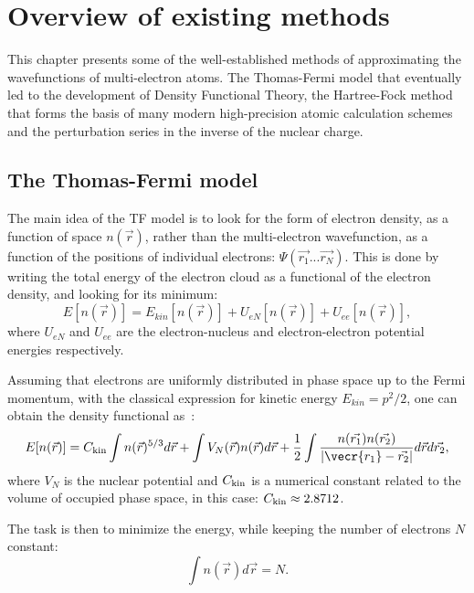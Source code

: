 \chapter{Overview of existing methods}
\label{ch:Methods}

This chapter presents some of the well-established methods of approximating the wavefunctions of multi-electron atoms. The Thomas-Fermi model that eventually led to the development of Density Functional Theory, the Hartree-Fock method that forms the basis of many modern high-precision atomic calculation schemes and the perturbation series in the inverse of the nuclear charge.

\section{The Thomas-Fermi model}
\label{sec:TF}

The main idea of the TF model is to look for the form of electron density, as a function of space $n(\vec{r})$, rather than the multi-electron wavefunction, as a function of the positions of individual electrons: $\Psi(\vec{r_1} ... \vec{r_N})$. This is done by writing the total energy of the electron cloud as a functional of the electron density, and looking for its minimum: 
\begin{equation}
     E[n(\vec{r})] = E_{kin}[n(\vec{r})] + U_{eN}[n(\vec{r})] + U_{ee}[n(\vec{r})],
\end{equation}
where $U_{eN}$ and $U_{ee}$ are the electron-nucleus and electron-electron potential energies respectively.

Assuming that electrons are uniformly distributed in phase space up to the Fermi momentum, with the classical expression for kinetic energy $E_{kin} = p^2/2$, one can obtain the density functional as~\cite{lundqvist2013theory}: 
\begin{equation} \label{TFenergy}
     E[n(\vec{r})] = C_{\rm{kin}}\int n(\vec{r})^{5/3} d \vec{r} + \int V_{N}(\vec{r})n(\vec{r}) d \vec{r} + \frac{1}{2} \int \frac{n(\vec{r_1}) n(\vec{r_2})}{|\vecr{r_1}-\vec{r_2}|} d\vec{r} d\vec{r_2},
\end{equation}
where $V_N$ is the nuclear potential and $C_{\rm{kin}}$ is a numerical constant related to the volume of occupied phase space, in this case: $C_{\rm{kin}} \approx 2.8712$.

The task is then to minimize the energy, while keeping the number of electrons $N$ constant:
\begin{equation}
    \int n(\vec{r})d \vec{r} = N.
\end{equation}

